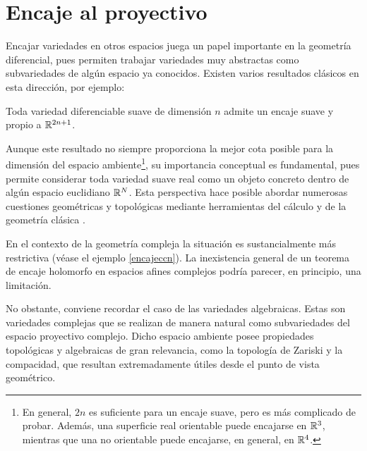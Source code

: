 \chapter{Encaje al proyectivo}\label{cap2}

	Encajar variedades en otros espacios juega un papel importante en la geometría diferencial, pues permiten trabajar variedades muy abstractas como subvariedades de algún espacio ya conocidos. Existen varios resultados clásicos en esta dirección, por ejemplo:
	
    \begin{theorem}
        Toda variedad diferenciable suave de dimensión $n$ admite un encaje suave y propio a $\mathbb{R}^{2n+1}$.
    \end{theorem}
    
    Aunque este resultado no siempre proporciona la mejor cota posible para la dimensión del espacio ambiente\footnote{En general, $2n$ es suficiente para un encaje suave, pero es más complicado de probar. Además, una superficie real orientable puede encajarse en $\mathbb{R}^3$, mientras que una no orientable puede encajarse, en general, en $\mathbb{R}^4$.}, su importancia conceptual es fundamental, pues permite considerar toda variedad suave real como un objeto concreto dentro de algún espacio euclidiano $\mathbb{R}^N$. Esta perspectiva hace posible abordar numerosas cuestiones geométricas y topológicas mediante herramientas del cálculo y de la geometría clásica \parencite[Ver Cap.~6]{lee2003smooth}.
    
    En el contexto de la geometría compleja la situación es sustancialmente más restrictiva (véase el ejemplo \ref{encajeccn}). La inexistencia general de un teorema de encaje holomorfo en espacios afines complejos podría parecer, en principio, una limitación.
    
    No obstante, conviene recordar el caso de las variedades algebraicas. Estas son variedades complejas que se realizan de manera natural como subvariedades del espacio proyectivo complejo. Dicho espacio ambiente posee propiedades topológicas y algebraicas de gran relevancia, como la topología de Zariski y la compacidad, que resultan extremadamente útiles desde el punto de vista geométrico.
   
